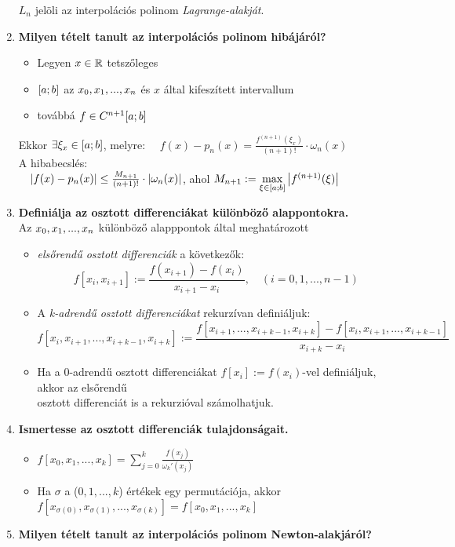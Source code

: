 \documentclass{article}
\begin{document}
\begin{enumerate}
\begin{itemize}
	\end{itemize}
	$L_n$ jelöli az interpolációs polinom \textit{Lagrange-alakját}.
	\item\textbf{Milyen tételt tanult az interpolációs polinom hibájáról?}
	\begin{itemize}
		\item Legyen $x\in\mathbb{R}$ tetszőleges
		\item $[a;b]$ az $x_0,x_1,...,x_n$ és $x$ által kifeszített intervallum
		\item továbbá $f\in C^{n+1}[a;b]$
	\end{itemize}
	Ekkor $\exists\xi_x\in[a;b]$, melyre:{\Large
	$\quad f(x)-p_n(x)=\frac{f^{(n+1)}(\xi_x)}{(n+1)!}\cdot\omega_n(x)$}\\
	A hibabecslés:\\[0.2cm]{\Large$\quad\abs{f(x)-p_n(x)}\leq
	\frac{M_{n+1}}{(n+1)!}\cdot\abs{\omega_n(x)}$}, ahol 
	{\Large $M_{n+1}:=\max\limits_{\xi\in[a;b]}\abs{f^{(n+1)}(\xi)}$}
	\newpage
	\item\textbf{Definiálja az osztott differenciákat különböző alappontokra.}\\
	Az $x_0,x_1,...,x_n$ különböző alapppontok által meghatározott
	\begin{itemize}
		\item\textit{elsőrendű osztott differenciák} a következők:{\Large
		\[f[x_i,x_{i+1}]:=\frac{f(x_{i+1})-f(x_i)}{x_{i+1}-x_i},\quad(i=0,1,...,n-1)\]}
		\item A \textit{k-adrendű osztott differenciákat} rekurzívan definiáljuk:
		{\Large\[f[x_i,x_{i+1},...,x_{i+k-1},x_{i+k}]:=
		\frac{f[x_{i+1},...,x_{i+k-1},x_{i+k}]-f[x_i,x_{i+1},...,x_{i+k-1}]}
		{x_{i+k}-x_i}\]}
		\item Ha a 0-adrendű osztott differenciákat $f[x_i]:=f(x_i)$-vel definiáljuk, akkor az elsőrendű \\ osztott differenciát is a rekurzióval számolhatjuk.
	\end{itemize}
	\item\textbf{Ismertesse az osztott differenciák tulajdonságait.}
	\begin{itemize}
		\item{\Large $f[x_0,x_1,...,x_k]=\sum\limits_{j=0}^k
		\frac{f(x_j)}{\omega_k'(x_j)}$}
		\item Ha $\sigma$ a ($0,1,...,k$) értékek egy permutációja, akkor \\[0.2cm]
		{\Large $f[x_{\sigma(0)},x_{\sigma(1)},...,x_{\sigma(k)}]=f[x_0,x_1,...,x_k]$}
	\end{itemize}
	\item\textbf{Milyen tételt tanult az interpolációs polinom Newton-alakjáról?}\\[0.1cm]

\end{enumerate}
\end{document}
